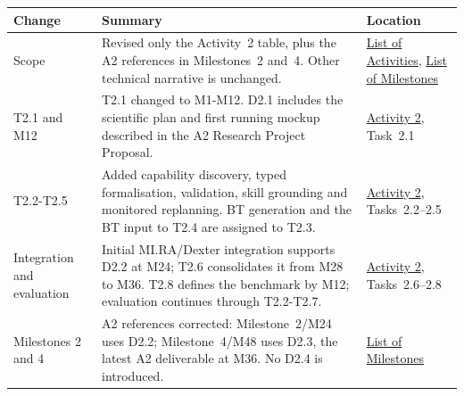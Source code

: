 \begin{longtable}[]{@{}
  >{\raggedright\arraybackslash}p{}
  >{\raggedright\arraybackslash}p{}
  >{\raggedright\arraybackslash}p{}@{}}
\toprule\noalign{}
\textbf{Change} & \textbf{Summary} & \textbf{Location} \\
\midrule\noalign{}
\endhead
\bottomrule\noalign{}
\endlastfoot
Scope & Revised only the Activity~2 table, plus the A2 references in
Milestones~2 and~4. Other technical narrative is unchanged. &
\hyperref[list-of-activities]{List of Activities},
\hyperref[list-of-milestones]{List of Milestones} \\
T2.1 and M12 & T2.1 changed to M1-M12. D2.1 includes the scientific plan
and first running mockup described in the A2 Research Project Proposal. &
\hyperref[activity-2]{Activity 2}, Task~2.1 \\
T2.2-T2.5 & Added capability discovery, typed formalisation, validation,
skill grounding and monitored replanning. BT generation and the BT input
to T2.4 are assigned to T2.3. &
\hyperref[activity-2]{Activity 2}, Tasks~2.2--2.5 \\
Integration and evaluation & Initial MI.RA/Dexter integration supports
D2.2 at M24; T2.6 consolidates it from M28 to M36. T2.8 defines the
benchmark by M12; evaluation continues through T2.2-T2.7. &
\hyperref[activity-2]{Activity 2}, Tasks~2.6--2.8 \\
Milestones 2 and 4 & A2 references corrected: Milestone~2/M24 uses D2.2;
Milestone~4/M48 uses D2.3, the latest A2 deliverable at M36. No D2.4 is
introduced. &
\hyperref[list-of-milestones]{List of Milestones} \\
\end{longtable}

\clearpage

